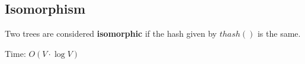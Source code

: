 \subsection{Isomorphism}

Two trees are considered \textbf{isomorphic} if the hash given by $thash()$ is the same.

Time: $O(V \cdot \log{V})$
